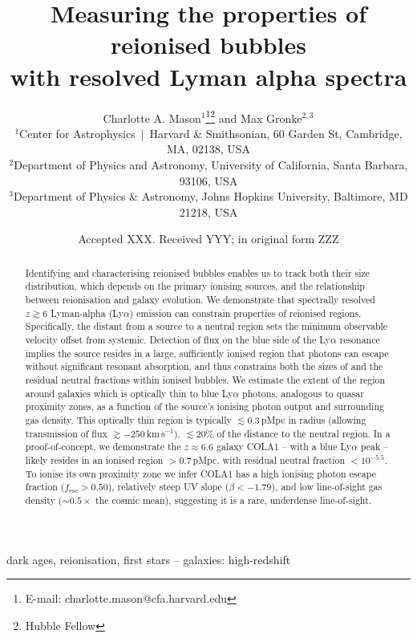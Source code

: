 \documentclass[fleqn,usenatbib]{mnras}
\title[Properties of reionised bubbles]{Measuring the properties of reionised bubbles\\with resolved Lyman alpha spectra}
\author[Mason and Gronke]{Charlotte A. Mason$^{1}$\thanks{E-mail: charlotte.mason@cfa.harvard.edu}\thanks{Hubble Fellow}
and Max Gronke$^{2,3}$\href{Hfootnote.2}{\samethanks}
\\
$^{1}$Center for Astrophysics \,|\, Harvard \& Smithsonian, 60 Garden St, Cambridge, MA, 02138, USA\\
$^{2}$Department of Physics and Astronomy, University of California, Santa Barbara, 93106, USA\\
$^{3}$Department of Physics \& Astronomy, Johns Hopkins University, Baltimore, MD 21218, USA
}
\date{Accepted XXX. Received YYY; in original form ZZZ}
\begin{document}
\label{firstpage}
\pagerange{\pageref{firstpage}--\pageref{lastpage}}
\maketitle

\begin{abstract}
%
Identifying and characterising reionised bubbles enables us to track both their size distribution, which depends on the primary ionising sources, and the relationship between reionisation and galaxy evolution.
%
We demonstrate that spectrally resolved $z\gtrsim6$ Lyman-alpha (Ly$\alpha$) emission can constrain properties of reionised regions.
%
Specifically, the distant from a source to a neutral region sets the minimum observable \lya velocity offset from systemic. Detection of flux on the blue side of the Ly$\alpha$ resonance implies the source resides in a large, sufficiently ionised region that photons can escape without significant resonant absorption, and thus constrains both the sizes of and the residual neutral fractions within ionised bubbles. 
%
We estimate the extent of the region around galaxies which is optically thin to blue Ly$\alpha$ photons, analogous to quasar proximity zones, as a function of the source's ionising photon output and surrounding gas density.
This optically thin region is typically $\lesssim 0.3$\,pMpc in radius (allowing transmission of flux $\gtrsim -250$\,km\,s$^{-1}$), $\lesssim 20$\% of the distance to the neutral region.
%
In a proof-of-concept, we demonstrate the $z\approx6.6$ galaxy COLA1 -- with a blue Ly$\alpha$ peak -- likely resides in an ionised region $>0.7$\,pMpc, with residual neutral fraction $<10^{-5.5}$. To ionise its own proximity zone we infer COLA1 has a high ionising photon escape fraction ($f_{\mathrm{esc}}>0.50$), relatively steep UV slope ($\beta < -1.79$), and low line-of-sight gas density ($\sim0.5\times$ the cosmic mean), suggesting it is a rare, underdense line-of-sight.
%
\end{abstract}

\begin{keywords}
dark ages, reionisation, first stars -- galaxies: high-redshift
\end{keywords}
\end{document}
